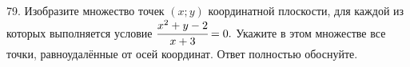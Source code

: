 79. Изобразите множество точек $(x;y)$ координатной плоскости, для каждой из которых выполняется условие $\cfrac{x^2+y-2}{x+3}=0.$ Укажите в этом множестве все точки, равноудалённые от осей координат. Ответ полностью обоснуйте.\\
